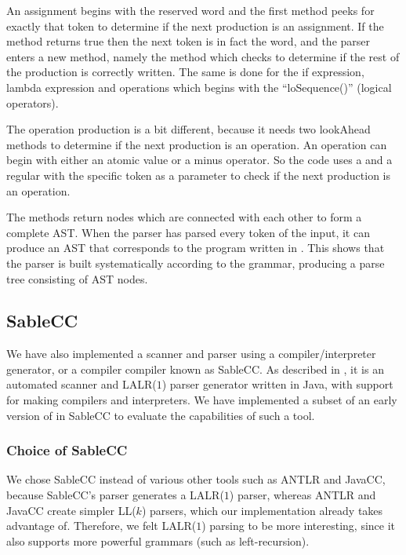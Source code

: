 An assignment begins with the reserved word  and the first
 method peeks for exactly that token to determine
if the next production is an assignment. If the method returns true then
the next token is in fact the  word, and the parser enters a
new method, namely the  method which checks to
determine if the rest of the production is correctly written. The same
is done for the if expression, lambda expression and operations which
begins with the ``loSequence()'' (logical operators).

The operation production is a bit different, because it needs two lookAhead
methods to determine if the next production is an operation. An operation can
begin with either an atomic value or a minus operator. So the code uses a
 and a regular  with the
specific token as a parameter to check if the next production is an operation.

The methods return nodes which are connected with each other to form
a complete AST\@. When the parser has parsed every token of the input,
it can produce an AST that corresponds to the program written in
\productname{}. This shows that the parser is built systematically
according to the grammar, producing a parse tree consisting of AST
nodes.

\subsection{SableCC}
We have also implemented a scanner and parser using a
compiler/interpreter generator, or a compiler compiler
known as SableCC\cite{sableccdoc}. As described in
, it is an automated scanner and
LALR($1$) parser generator written in Java, with support for making
compilers and interpreters. We have implemented a subset of an early
version of \productname{} in SableCC to evaluate the capabilities of
such a tool.

\subsubsection{Choice of SableCC}
We chose SableCC instead of various other tools such as ANTLR\cite{antlr}
and JavaCC\cite{javacc}, because SableCC's parser generates a LALR($1$)
parser, whereas ANTLR and JavaCC create simpler LL($k$) parsers, which
our implementation already takes advantage of. Therefore, we felt LALR($1$)
parsing to be more interesting, since it also supports more powerful
grammars (such as left-recursion).


